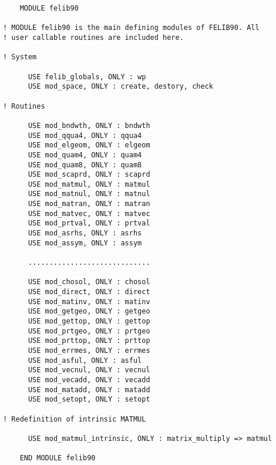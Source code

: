 \begin{verbatim}
    MODULE felib90

! MODULE felib90 is the main defining modules of FELIB90. All
! user callable routines are included here.

! System

      USE felib_globals, ONLY : wp
      USE mod_space, ONLY : create, destory, check

! Routines

      USE mod_bndwth, ONLY : bndwth
      USE mod_qqua4, ONLY : qqua4
      USE mod_elgeom, ONLY : elgeom
      USE mod_quam4, ONLY : quam4
      USE mod_quam8, ONLY : quam8
      USE mod_scaprd, ONLY : scaprd
      USE mod_matmul, ONLY : matmul
      USE mod_matnul, ONLY : matnul
      USE mod_matran, ONLY : matran
      USE mod_matvec, ONLY : matvec
      USE mod_prtval, ONLY : prtval
      USE mod_asrhs, ONLY : asrhs
      USE mod_assym, ONLY : assym
      
      .............................
      
      USE mod_chosol, ONLY : chosol
      USE mod_direct, ONLY : direct
      USE mod_matinv, ONLY : matinv
      USE mod_getgeo, ONLY : getgeo
      USE mod_gettop, ONLY : gettop
      USE mod_prtgeo, ONLY : prtgeo
      USE mod_prttop, ONLY : prttop
      USE mod_errmes, ONLY : errmes
      USE mod_asful, ONLY : asful
      USE mod_vecnul, ONLY : vecnul
      USE mod_vecadd, ONLY : vecadd
      USE mod_matadd, ONLY : matadd
      USE mod_setopt, ONLY : setopt

! Redefinition of intrinsic MATMUL

      USE mod_matmul_intrinsic, ONLY : matrix_multiply => matmul

    END MODULE felib90
\end{verbatim}